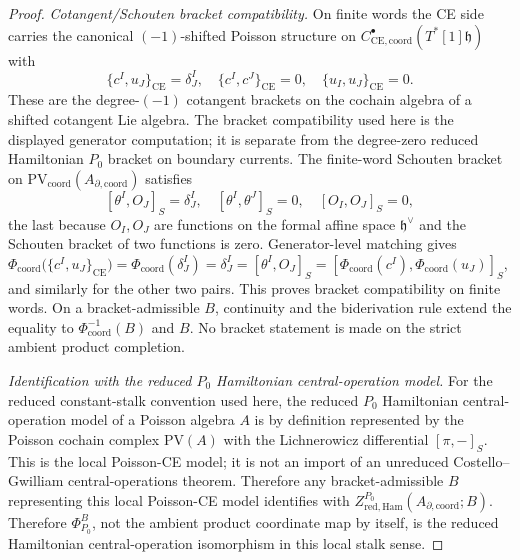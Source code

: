 \documentclass[11pt]{memoir}
\begin{document}
\begin{proof}
	  \emph{Cotangent/Schouten bracket compatibility.} On finite words the CE side carries the canonical
  $(-1)$-shifted Poisson structure on
  \(C^\bullet_{\mathrm{CE},\mathrm{coord}}(T^*[1]\mathfrak h)\) with
  $$\{c^I,u_J\}_{\mathrm{CE}}=\delta^I_J,\quad
    \{c^I,c^J\}_{\mathrm{CE}}=0,\quad
    \{u_I,u_J\}_{\mathrm{CE}}=0.$$
  These are the degree-\((-1)\) cotangent brackets on the cochain
  algebra of a shifted cotangent Lie algebra. The bracket compatibility
  used here is the displayed generator computation; it is separate from
  the degree-zero reduced Hamiltonian \(P_0\) bracket on boundary currents.
	  The finite-word Schouten bracket on
	  \(\mathrm{PV}_{\mathrm{coord}}(A_{\partial,\mathrm{coord}})\) satisfies
  $$[\theta^I,O_J]_S=\delta^I_J,\quad
    [\theta^I,\theta^J]_S=0,\quad
    [O_I,O_J]_S=0,$$
  the last because $O_I,O_J$ are functions on the formal affine space
  $\mathfrak h^\vee$ and the Schouten bracket of two functions is zero.
  Generator-level matching gives
	  $\Phi_{\mathrm{coord}}\bigl(\{c^I,u_J\}_{\mathrm{CE}}\bigr)
	  =\Phi_{\mathrm{coord}}(\delta^I_J)=\delta^I_J=[\theta^I,O_J]_S
	  =[\Phi_{\mathrm{coord}}(c^I),\Phi_{\mathrm{coord}}(u_J)]_S$, and
	  similarly for the other two pairs.  This proves bracket compatibility
	  on finite words.  On a bracket-admissible \(B\), continuity and the
	  biderivation rule extend the equality to
	  \(\Phi_{\mathrm{coord}}^{-1}(B)\) and \(B\).  No bracket statement is
	  made on the strict ambient product completion.

  \emph{Identification with the reduced $P_0$ Hamiltonian central-operation model.}
  For the reduced constant-stalk convention used here, the
  reduced \(P_0\) Hamiltonian central-operation model of a Poisson algebra \(A\) is by
  definition represented by the Poisson cochain complex
  $\mathrm{PV}(A)$ with the Lichnerowicz differential $[\pi,-]_S$.
  This is the local Poisson-CE model; it is not an import of an
  unreduced Costello--Gwilliam central-operations theorem. Therefore
	  any bracket-admissible \(B\) representing this local Poisson-CE model
	  identifies with
		  \(Z^{P_0}_{\mathrm{red,Ham}}(A_{\partial,\mathrm{coord}};B)\).  Therefore
	  \(\Phi^B_{P_0}\), not the ambient product coordinate map by itself, is
	  the reduced Hamiltonian central-operation isomorphism in this local
	  stalk sense.
\end{proof}
\end{document}
